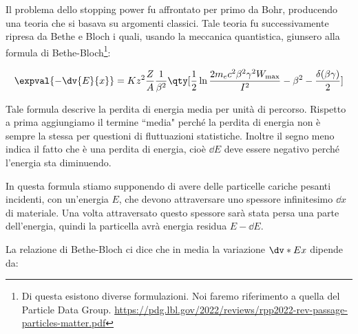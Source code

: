 Il problema dello stopping power fu affrontato per primo da Bohr, producendo una teoria che si basava su argomenti classici. Tale teoria fu successivamente ripresa da Bethe e Bloch i quali, usando la meccanica quantistica, giunsero alla formula di Bethe-Bloch\footnote{Di questa esistono diverse formulazioni. Noi faremo riferimento a quella del Particle Data Group. \url{https://pdg.lbl.gov/2022/reviews/rpp2022-rev-passage-particles-matter.pdf}}:

\begin{equation*}
    \expval{-\dv{E}{x}}
    =Kz^2\frac{Z}{A} \frac{1}{\beta^2} \qty[ \frac{1}{2}\ln{\frac{2m_e c^2 \beta^2 \gamma^2 W_{\rm max}}{I^2}} - \beta^2 - \frac{\delta(\beta \gamma)}{2} ]
\end{equation*}

Tale formula descrive la perdita di energia media per unità di percorso. Rispetto a prima aggiungiamo il termine ``media" perché la perdita di energia non è sempre la stessa per questioni di fluttuazioni statistiche. Inoltre il segno meno indica il fatto che è una perdita di energia, cioè $\dd{E}$ deve essere negativo perché l'energia sta diminuendo.

\begin{minipage}{0.295\textwidth}
    \begin{figure}[H]
        \centering
    \end{figure}
\end{minipage}
\begin{minipage}{0.7\textwidth}
    \vspace{0.35cm}In questa formula stiamo supponendo di avere delle particelle cariche pesanti incidenti, con un'energia $E$, che devono attraversare uno spessore infinitesimo $\dd{x}$ di materiale. Una volta attraversato questo spessore sarà stata persa una parte dell'energia, quindi la particella avrà energia residua $E - \dd{E}$.
\end{minipage}

\vspace{0.3cm}La relazione di Bethe-Bloch ci dice che in media la variazione $\dv*{E}{x}$ dipende da:

